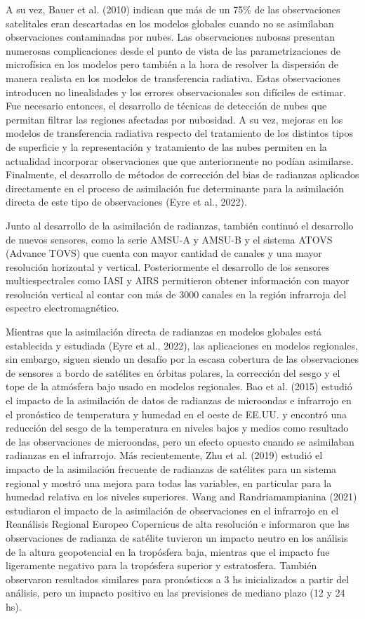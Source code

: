 \documentclass[12pt,oneside,a4paper]{reedthesis}
\begin{document}
A su vez, Bauer et al. (2010) indican que más de un 75\% de las observaciones satelitales eran descartadas en los modelos globales cuando no se asimilaban observaciones contaminadas por nubes. Las observaciones nubosas presentan numerosas complicaciones desde el punto de vista de las parametrizaciones de microfísica en los modelos pero también a la hora de resolver la dispersión de manera realista en los modelos de transferencia radiativa. Estas observaciones introducen no linealidades y los errores observacionales son difíciles de estimar. Fue necesario entonces, el desarrollo de técnicas de detección de nubes que permitan filtrar las regiones afectadas por nubosidad. A su vez, mejoras en los modelos de transferencia radiativa respecto del tratamiento de los distintos tipos de superficie y la representación y tratamiento de las nubes permiten en la actualidad incorporar observaciones que que anteriormente no podían asimilarse. Finalmente, el desarrollo de métodos de corrección del bias de radianzas aplicados directamente en el proceso de asimilación fue determinante para la asimilación directa de este tipo de observaciones (Eyre et al., 2022).

Junto al desarrollo de la asimilación de radianzas, también continuó el desarrollo de nuevos sensores, como la serie AMSU-A y AMSU-B y el sistema ATOVS (Advance TOVS) que cuenta con mayor cantidad de canales y una mayor resolución horizontal y vertical. Posteriormente el desarrollo de los sensores multiespectrales como IASI y AIRS permitieron obtener información con mayor resolución vertical al contar con más de 3000 canales en la región infrarroja del espectro electromagnético.

Mientras que la asimilación directa de radianzas en modelos globales está establecida y estudiada (Eyre et al., 2022), las aplicaciones en modelos regionales, sin embargo, siguen siendo un desafío por la escasa cobertura de las observaciones de sensores a bordo de satélites en órbitas polares, la corrección del sesgo y el tope de la atmósfera bajo usado en modelos regionales. Bao et al. (2015) estudió el impacto de la asimilación de datos de radianzas de microondas e infrarrojo en el pronóstico de temperatura y humedad en el oeste de EE.UU. y encontró una reducción del sesgo de la temperatura en niveles bajos y medios como resultado de las observaciones de microondas, pero un efecto opuesto cuando se asimilaban radianzas en el infrarrojo. Más recientemente, Zhu et al. (2019) estudió el impacto de la asimilación frecuente de radianzas de satélites para un sistema regional y mostró una mejora para todas las variables, en particular para la humedad relativa en los niveles superiores. Wang and Randriamampianina (2021) estudiaron el impacto de la asimilación de observaciones en el infrarrojo en el Reanálisis Regional Europeo Copernicus de alta resolución e informaron que las observaciones de radianza de satélite tuvieron un impacto neutro en los análisis de la altura geopotencial en la tropósfera baja, mientras que el impacto fue ligeramente negativo para la tropósfera superior y estratosfera. También observaron resultados similares para pronósticos a 3 hs inicializados a partir del análisis, pero un impacto positivo en las previsiones de mediano plazo (12 y 24 hs).
\end{document}
